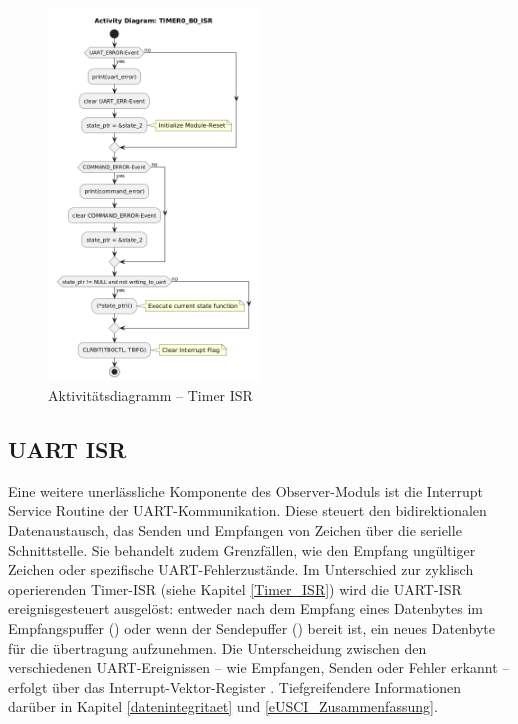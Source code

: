 \begin{figure}[h!]
	\centering
	\includegraphics[width=0.50\textwidth]{../Bilder/observer_activity_diagram_timer_b0.png}
	\caption{Aktivit\"atsdiagramm -- Timer ISR}
	\label{fig:activity_diagram_timer_isr}
\end{figure}


\newpage
\subsection{UART ISR}
\label{UART_ISR}

Eine weitere unerl\"assliche Komponente des Observer-Moduls ist die Interrupt Service Routine der UART-Kommunikation. Diese steuert den bidirektionalen Datenaustausch, \dahe das Senden und Empfangen von Zeichen \"uber die serielle Schnittstelle. Sie behandelt zudem Grenzf\"allen, wie den Empfang ung\"ultiger Zeichen oder spezifische UART-Fehlerzust\"ande. Im Unterschied zur zyklisch operierenden Timer-ISR (siehe Kapitel \ref{Timer_ISR}) wird die UART-ISR ereignisgesteuert ausgel\"ost: entweder nach dem Empfang eines Datenbytes im Empfangspuffer () oder wenn der Sendepuffer () bereit ist, ein neues Datenbyte f\"ur die \"ubertragung aufzunehmen. Die Unterscheidung zwischen den verschiedenen UART-Ereignissen -- wie \zB Empfangen, Senden oder Fehler erkannt -- erfolgt \"uber das Interrupt-Vektor-Register . Tiefgreifendere Informationen dar\"uber in Kapitel \ref{datenintegritaet} und \ref{eUSCI_Zusammenfassung}.

